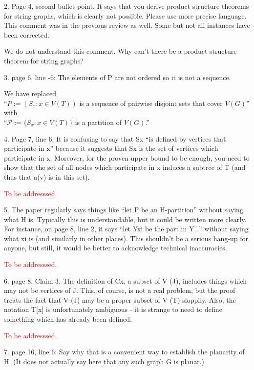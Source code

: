 \documentclass[12pt]{article}
\newcommand{\tba}{\textcolor{red}{To be addresssed.}}
\newenvironment{response}{\color{blue}}{}
\begin{document}
2. Page 4, second bullet point. It says that you derive product structure
theorems for string graphs, which is clearly not possible. Please use
more precise language. This comment was in the previous review as
well. Some but not all instances have been corrected.

\begin{response}
We do not understand this comment. Why can't there be a product structure
theorem for string graphs?
\end{response}

3. page 6, line -6: The elements of P are not ordered so it is not a sequence.

\begin{response}
  We have replaced \\
  ``$P := (S_x : x \in V (T))$ is a sequence of pairwise disjoint sets that cover $V(G)$'' \\
  with \\
  ``$\mathcal{P}:=\{S_x : x\in V(T)\}$ is a partition of $V(G)$.''
\end{response}

4. Page 7, line 6: It is confusing to say that Sx “is defined by vertices
that participate in x” because it suggests that Sx is the set of vertices
which participate in x. Moreover, for the proven upper bound to be
enough, you need to show that the set of all nodes which participate in
x induces a subtree of T (and thus that a(v) is in this set).

\tba

5. The paper regularly says things like “let P be an H-partition” without
saying what H is. Typically this is understandable, but it could be
written more clearly. For instance, on page 8, line 2, it says “let Yxi
be the part in Y...” without saying what xi
is (and similarly in other
places). This shouldn’t be a serious hang-up for anyone, but still, it
would be better to acknowledge technical inaccuracies.

\tba

6. page 8, Claim 3. The definition of Cx, a subset of V (J), includes things
which may not be vertices of J. This, of course, is not a real problem,
but the proof treats the fact that V (J) may be a proper subset of
V (T) sloppily. Also, the notation T[x] is unfortunately ambiguous - it
is strange to need to define something which has already been defined.

\tba

7. page 16, line 6: Say why that is a convenient way to establish the
planarity of H. (It does not actually say here that any such graph G
is planar.)
\end{document}

